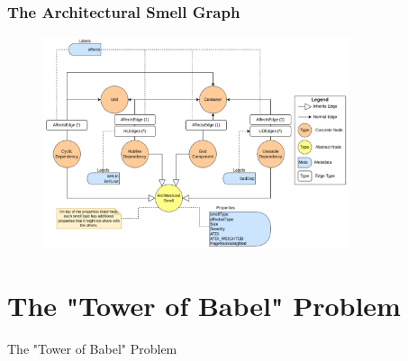 \documentclass[dvipsnames, 10pt]{beamer}
\begin{document}
\begin{frame}
  \frametitle{The Architectural Smell Graph}
  \begin{figure}
    \begin{center}
      \includegraphics[width=0.8\textwidth]{figures/architectural-smells/arcan-smell-graph.png}
    \end{center}
  \end{figure}
\end{frame}

\section{The "Tower of Babel" Problem}
\begin{frame}
  \centering
  \Huge
  The "Tower of Babel" Problem
\end{frame}
\end{document}
